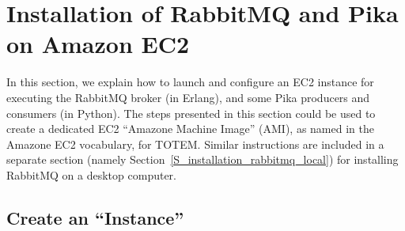 
\section{Installation of RabbitMQ and Pika on Amazon EC2}
\label{S_installation_rabbitmq_ec2}


In this section, we explain how to launch and configure an EC2
instance for executing the RabbitMQ broker (in Erlang), and some Pika
producers and consumers (in Python). The steps presented in this
section could be used to create a dedicated EC2 ``Amazone Machine
Image'' (AMI), as named in the Amazone EC2 vocabulary, for TOTEM.
Similar instructions are included in a separate
section (namely Section~\ref{S_installation_rabbitmq_local}) for
installing RabbitMQ on a desktop computer.

\subsection{Create an ``Instance''}
\label{SS_ec2_create_instance}

